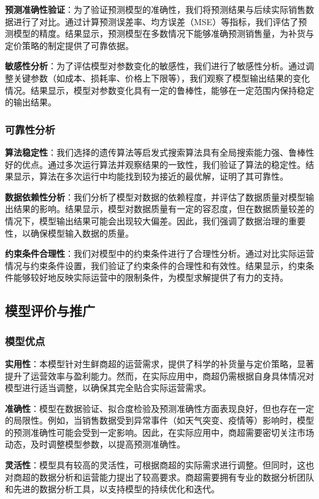 \documentclass{cumcmthesis}
\begin{document}
\textbf{预测准确性验证}：为了验证预测模型的准确性，我们将预测结果与后续实际销售数据进行了对比。通过计算预测误差率、均方误差（MSE）等指标，我们评估了预测模型的精度。结果显示，预测模型在多数情况下能够准确预测销售量，为补货与定价策略的制定提供了可靠依据。

\textbf{敏感性分析}：为了评估模型对参数变化的敏感性，我们进行了敏感性分析。通过调整关键参数（如成本、损耗率、价格上下限等），我们观察了模型输出结果的变化情况。结果显示，模型对参数变化具有一定的鲁棒性，能够在一定范围内保持稳定的输出结果。

\subsubsection{可靠性分析}

\textbf{算法稳定性}：我们选择的遗传算法等启发式搜索算法具有全局搜索能力强、鲁棒性好的优点。通过多次运行算法并观察结果的一致性，我们验证了算法的稳定性。结果显示，算法在多次运行中均能找到较为接近的最优解，证明了其可靠性。

\textbf{数据依赖性分析}：我们分析了模型对数据的依赖程度，并评估了数据质量对模型输出结果的影响。结果显示，模型对数据质量有一定的容忍度，但在数据质量较差的情况下，模型输出结果可能会出现较大偏差。因此，我们强调了数据治理的重要性，以确保模型输入数据的质量。

\textbf{约束条件合理性}：我们对模型中的约束条件进行了合理性分析。通过对比实际运营情况与约束条件设置，我们验证了约束条件的合理性和有效性。结果显示，约束条件能够较好地反映实际运营中的限制条件，为模型求解提供了有力的支持。

\subsection{模型评价与推广}
\subsubsection{模型优点}
\textbf{实用性}：本模型针对生鲜商超的运营需求，提供了科学的补货量与定价策略，显著提升了运营效率与盈利能力。然而，在实际应用中，商超仍需根据自身具体情况对模型进行适当调整，以确保其完全贴合实际运营需求。

\textbf{准确性}：模型在数据验证、拟合度检验及预测准确性方面表现良好，但也存在一定的局限性。例如，当销售数据受到异常事件（如天气突变、疫情等）影响时，模型的预测准确性可能会受到一定影响。因此，在实际应用中，商超需要密切关注市场动态，及时调整模型参数，以提高预测准确性。

\textbf{灵活性}：模型具有较高的灵活性，可根据商超的实际需求进行调整。但同时，这也对商超的数据分析和运营能力提出了较高要求。商超需要拥有专业的数据分析团队和先进的数据分析工具，以支持模型的持续优化和迭代。
\end{document}

